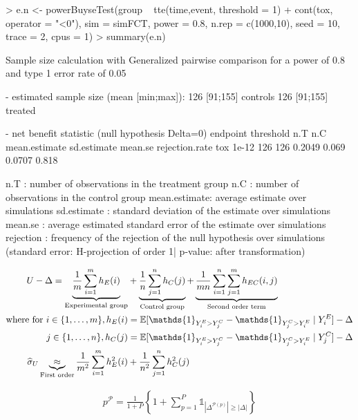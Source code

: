 \documentclass[12pt]{article}
\theoremstyle{definition}
\begin{document}
\begin{Rcode}
> e.n <- powerBuyseTest(group ~ tte(time,event, threshold = 1) + cont(tox, operator = "<0"),
                        sim = simFCT, power = 0.8,
                        n.rep = c(1000,10), seed = 10, trace = 2, cpus = 1)
> summary(e.n)
\end{Rcode}

\begin{Routput}
        Sample size calculation with Generalized pairwise comparison
        for a power of 0.8 and type 1 error rate of 0.05 

- estimated sample size (mean [min;max]): 126 [91;155] controls
126 [91;155] treated

- net benefit statistic (null hypothesis Delta=0)
endpoint threshold n.T n.C mean.estimate sd.estimate mean.se rejection.rate
     tox     1e-12 126 126        0.2049       0.069  0.0707          0.818

n.T          : number of observations in the treatment group
n.C          : number of observations in the control group
mean.estimate: average estimate over simulations
sd.estimate  : standard deviation of the estimate over simulations
mean.se      : average estimated standard error of the estimate over simulations
rejection    : frequency of the rejection of the null hypothesis over simulations
(standard error: H-projection of order 1| p-value: after transformation) 
\end{Routput}


\clearpage

\begin{align*}
	U - \Delta = \underbrace{\frac{1}{m} \sum_{i=1}^{m} h_E(i)}_{\text{Experimental group}}&  + \underbrace{\frac{1}{n} \sum_{j=1}^{n} h_C(j)}_{\text{Control group}} + \underbrace{ \frac{1}{m n}  \sum_{i=1}^{n}\sum_{j=1}^{m} h_{EC}(i,j)}_{\text{Second order term}} \notag \\
	\text{where for } i \in \{1,\ldots,m\}, h_E(i)&=\mathbb{E}[\mathds{1}_{Y^E_i > Y^C_j} - \mathds{1}_{Y^C_j > Y^E_i}\mid Y^E_i] - \Delta \notag \\
	j \in \{1,\ldots,n\}, h_C(j)&=\mathbb{E}[\mathds{1}_{Y^E_i > Y^C_j} - \mathds{1}_{Y^C_j > Y^E_i}\mid Y^C_j] - \Delta \notag  \\
 \widehat{\sigma}_{U} \underbrace{\approx}_{\text{First order}} \frac{1}{m^2} \sum_{i=1}^m h^2_E(i) &+ \frac{1}{n^2} \sum_{j=1}^n h^2_C(j)
\end{align*}

\begin{align*}
	p^{\mathcal{P}} = \frac{1}{1+P} \left\{1+\sum_{p=1}^P \mathds{1}_{\left| \Delta^{\mathcal{P}(p)}\right| \geq \left|\Delta \right|} \right\}
\end{align*}
\end{document}
